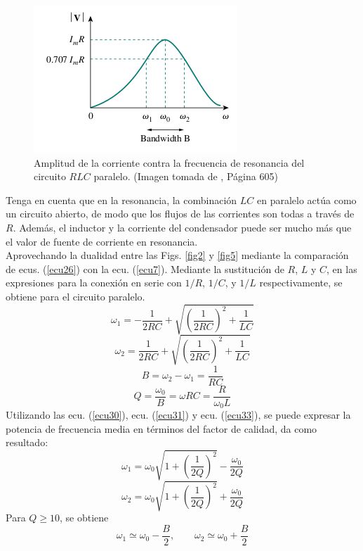 \documentclass[twocolumn]{IEEEtran}
\begin{document}
\begin{figure}[H]
	\centering
		\includegraphics[scale=0.75]{parares.png}
	\caption{Amplitud de la corriente contra la frecuencia de resonancia del circuito $RLC$ paralelo. (Imagen tomada de \cite{sadiku}, Página 605)}
	\label{fig6}
\end{figure}
\noindent
Tenga en cuenta que en la resonancia, la combinación $LC$ en paralelo actúa como un circuito abierto, de modo que los flujos de las corrientes son todas a través de $R$. Además, el inductor y la corriente del condensador puede ser mucho más que el valor de fuente de corriente en resonancia.\\
Aprovechando la dualidad entre las Figs. \ref{fig2} y \ref{fig5} mediante la comparación de ecus. (\ref{ecu26}) con la ecu. (\ref{ecu7}). Mediante la sustitución de $R$, $L$ y $C$, en las expresiones para la conexión en serie con $ 1 / R $, $ 1 / C$, y $ 1 / L$ respectivamente, se obtiene para el circuito paralelo.
\begin{equation}
 {\omega _1} =  - \frac{1}{{2RC}} + \sqrt {{{\left( {\frac{1}{{2RC}}} \right)}^2} + \frac{1}{{LC}}} 
\label{ecu30}
\end{equation}
\begin{equation}
 {\omega _2} =  \frac{1}{{2RC}} + \sqrt {{{\left( {\frac{1}{{2RC}}} \right)}^2} + \frac{1}{{LC}}} 
\label{ecu31}
\end{equation}
\begin{equation}
 B = \omega _2 - \omega _1 = \frac{1}{RC}
\label{ecu32}
\end{equation}
\begin{equation}
 Q = \frac{\omega _0}{B} = \omega RC = \frac{R}{\omega _0 L}
\label{ecu33}
\end{equation}
\noindent
Utilizando las ecu. (\ref{ecu30}), ecu. (\ref{ecu31}) y ecu. (\ref{ecu33}), se puede expresar la potencia de frecuencia media en términos del factor de calidad, da como resultado:
\begin{equation}
 {\omega _1} = {\omega _0}\sqrt {1 + {{\left( {\frac{1}{{2Q}}} \right)}^2}}  - \frac{{{\omega _0}}}{{2Q}}
\label{ecu34}
\end{equation}
\begin{equation}
 {\omega _2} = {\omega _0}\sqrt {1 + {{\left( {\frac{1}{{2Q}}} \right)}^2}}  + \frac{{{\omega _0}}}{{2Q}}
\label{ecu35}
\end{equation}
\noindent Para $Q \geq 10$, se obtiene
\begin{equation}
 \omega _1 \simeq \omega _0 - \frac{B}{2}, \ \ \ \ \ \ \ \ \ \omega _2 \simeq \omega _0 + \frac{B}{2}
\label{ecu36}
\end{equation}
\end{document}
